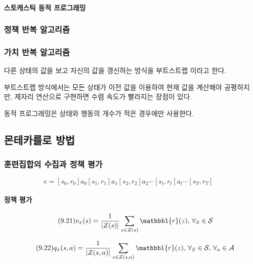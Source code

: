 \documentclass [12pt] {oblivoir}
\let\oldsubsubsection=\subsubsection
\renewcommand{\subsubsection}
{
  \filbreak
  \oldsubsubsection
}
\begin{document}
\paragraph*{스토캐스틱 동적 프로그래밍}\mbox{}

\vspace{3mm}

\subsubsection{정책 반복 알고리즘}

\subsubsection{가치 반복 알고리즘}

다른 상태의 값을 보고 자신의 값을 갱신하는 방식을 부트스트랩 이라고 한다.

부트스트랩 방식에서는 모든 상태가 이전 값을 이용하여 현재 값을 계산해야 공평하지만, 제자리 연산으로 구현하면 수렴 속도가 빨라지는 장점이 있다.

동적 프로그래밍은 상태와 행동의 개수가 적은 경우에만 사용한다.

\subsection{몬테카를로 방법}

\subsubsection{훈련집합의 수집과 정책 평가}

\begin{equation} \tag{9.20}
  e = [s_{0}, r_{0}]a_{0}[s_{1}, r_{1}]a_{1}[s_{2}, r_{2}]a_{2} \cdots [s_{t}, r_{t}]a_{t} \cdots [s_{T}, r_{T}]
\end{equation}

\paragraph*{정책 평가}\mbox{}

\begin{equation} \tag{9.21}
  v_{\pi}(s) = \frac{1}{\vert Z(s) \vert}\sum_{z \in Z(s)}\mathbbl{r}(z),\, \forall_{S} \in \mathcal{S}
\end{equation}

\begin{equation} \tag{9.22}
  q_{\pi}(s, a) = \frac{1}{\vert Z(s, a) \vert}\sum_{z \in Z(s,a)}\mathbbl{r}(z),\, \forall_{S} \in \mathcal{S},\, \forall_{a} \in \mathcal{A}
\end{equation}
\end{document}
